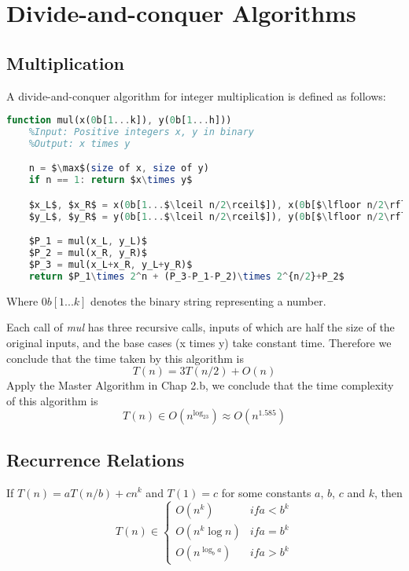 \section{Divide-and-conquer Algorithms}

\subsection{Multiplication}

\begin{definition}
A divide-and-conquer algorithm for integer multiplication is defined as follows:
\begin{lstlisting}[mathescape=true, language=Octave]
function mul(x(0b[1...k]), y(0b[1...h]))
	%Input: Positive integers x, y in binary
	%Output: x times y

	n = $\max$(size of x, size of y)
	if n == 1: return $x\times y$

	$x_L$, $x_R$ = x(0b[1...$\lceil n/2\rceil$]), x(0b[$\lfloor n/2\rfloor$...n])
	$y_L$, $y_R$ = y(0b[1...$\lceil n/2\rceil$]), y(0b[$\lfloor n/2\rfloor$...n])

	$P_1 = mul(x_L, y_L)$
	$P_2 = mul(x_R, y_R)$
	$P_3 = mul(x_L+x_R, y_L+y_R)$
	return $P_1\times 2^n + (P_3-P_1-P_2)\times 2^{n/2}+P_2$
\end{lstlisting}
Where $0b[1...k]$ denotes the binary string representing a number.
\end{definition}
Each call of \textit{mul} has three recursive calls, inputs of which are half the size of the original inputs, and the base cases (x times y) take constant time. Therefore we conclude that the time taken by this algorithm is
\[
T(n) = 3T(n/2)+O(n)
\]
Apply the Master Algorithm in Chap 2.b, we conclude that the time complexity of this algorithm is
\[
T(n) \in O(n^{\log_23}) \approx O(n^{1.585})
\]

\subsection{Recurrence Relations}

\begin{theorem}
If $T(n) = aT(n/b) + cn^k$ and $T(1) = c$ for some constants $a$, $b$, $c$ and $k$, then
\begin{equation*}
T(n) \in \begin{cases}
O(n^k) &if a<b^k \\
O(n^k\log n) &if a=b^k \\
O(n^{\log_ba}) &if a>b^k
\end{cases}
\end{equation*}
\end{theorem}

